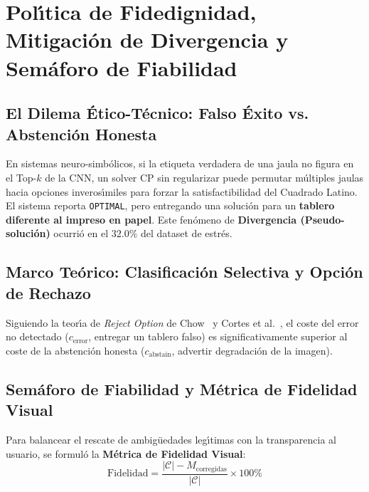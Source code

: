 \documentclass[conference]{IEEEtran}
\begin{document}
\section{Pol\'{\i}tica de Fidedignidad, Mitigaci\'on de Divergencia y Sem\'aforo de Fiabilidad}
\label{sec:reliability}

\subsection{El Dilema \'Etico-T\'ecnico: Falso \'Exito vs. Abstenci\'on Honesta}
En sistemas neuro-simb\'olicos, si la etiqueta verdadera de una jaula no figura en el Top-$k$ de la CNN, un solver CP sin regularizar puede permutar m\'ultiples jaulas hacia opciones inveros\'{\i}miles para forzar la satisfactibilidad del Cuadrado Latino. El sistema reporta \texttt{OPTIMAL}, pero entregando una soluci\'on para un \textbf{tablero diferente al impreso en papel}. Este fen\'omeno de \textbf{Divergencia (Pseudo-soluci\'on)} ocurri\'o en el $32.0\%$ del dataset de estr\'es.

\subsection{Marco Te\'orico: Clasificaci\'on Selectiva y Opci\'on de Rechazo}
Siguiendo la teor\'{\i}a de \textit{Reject Option} de Chow~\cite{chow1970optimum} y Cortes et al.~\cite{cortes2016learning}, el coste del error no detectado ($c_{\text{error}}$, entregar un tablero falso) es significativamente superior al coste de la abstenci\'on honesta ($c_{\text{abstain}}$, advertir degradaci\'on de la imagen).

\subsection{Sem\'aforo de Fiabilidad y M\'etrica de Fidelidad Visual}
Para balancear el rescate de ambig\"uedades leg\'{\i}timas con la transparencia al usuario, se formul\'o la \textbf{M\'etrica de Fidelidad Visual}:
\begin{equation}
    \text{Fidelidad} = \frac{|\mathcal{C}| - M_{\text{corregidas}}}{|\mathcal{C}|} \times 100\%
\end{equation}
\end{document}
